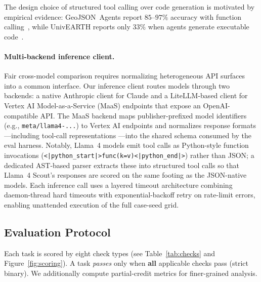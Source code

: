 \documentclass[sigconf]{acmart}
\begin{document}
The design choice of structured tool calling over code generation is motivated by empirical evidence: GeoJSON~Agents report $85$--$97\%$ accuracy with function calling~\citep{luo2025geojsonagents}, while UnivEARTH reports only $33\%$ when agents generate executable code~\citep{kao2025univearth}.

\paragraph{Multi-backend inference client.}
Fair cross-model comparison requires normalizing heterogeneous API surfaces into a common interface. Our inference client routes models through two backends: a native Anthropic client for Claude and a LiteLLM-based client for Vertex AI Model-as-a-Service (MaaS) endpoints that expose an OpenAI-compatible API. The MaaS backend maps publisher-prefixed model identifiers (e.g., \texttt{meta/llama4-...}) to Vertex AI endpoints and normalizes response formats ---including tool-call representations ---into the shared schema consumed by the eval harness. Notably, Llama~4 models emit tool calls as Python-style function invocations (\texttt{<|python\_start|>func(k=v)<|python\_end|>}) rather than JSON; a dedicated AST-based parser extracts these into structured tool calls so that Llama~4 Scout's responses are scored on the same footing as the JSON-native models. Each inference call uses a layered timeout architecture combining daemon-thread hard timeouts with exponential-backoff retry on rate-limit errors, enabling unattended execution of the full case-seed grid.


\subsection{Evaluation Protocol}
\label{sec:scoring}

Each task is scored by eight check types (see Table~\ref{tab:checks} and Figure~\ref{fig:scoring}). A task \emph{passes} only when \textbf{all} applicable checks pass (strict binary). We additionally compute partial-credit metrics for finer-grained analysis.
\end{document}
